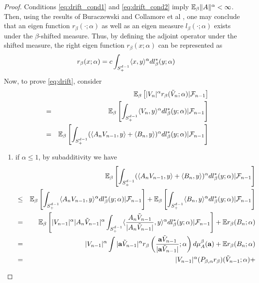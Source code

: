 \documentclass{article}
\theoremstyle{remark}
\begin{document}
\begin{proof}
  Conditions \eqref{eq:drift_cond1} and \eqref{eq:drift_cond2} imply $\mathbb{E}_\beta
  \|A\|^\alpha < \infty$. Then, using the results of Buraczewski and
  Collamore et al \cite{BCDZ2014}, one may conclude that an eigen
  function $r_\beta(\cdot; \alpha)$ as well as an eigen measure
  $l_\beta(\cdot; \alpha)$ exists under the $\beta$-shifted
  measure. Thus, by defining the adjoint operator under  the shifted
  measure, the right eigen function $r_\beta(x; \alpha)$ can be represented as
  \[
  r_\beta(x; \alpha) = c \int_{S_+^{d-1}} \langle x, y\rangle^\alpha
  dl^*_{\beta}(y; \alpha)
  \]
Now, to prove \eqref{eq:drift}, consider
  \begin{eqnarray}
    && \mathbb{E}_\beta \left[ |V_n|^\alpha r_\beta(\tilde V_n; \alpha) | \mathcal F_{n-1} \right]
    \nonumber \\
    &=& \mathbb{E}_\beta\left[\int_{S_+^{d-1}} \langle V_n, y\rangle^\alpha dl^*_{\beta}(y; \alpha)|
      \mathcal F_{n-1} \right]
    \nonumber \\
    &=& \mathbb{E}_\beta\left[\int_{S_+^{d-1}} (\langle A_n V_{n-1}, y\rangle + \langle B_n,
        y\rangle)^\alpha dl^*_{\beta}(y; \alpha) | \mathcal F_{n-1} \right]
    \label{eq:drift_proof_1}
  \end{eqnarray}
  \begin{enumerate}
  \item if $\alpha \leq 1$, by subadditivity we have
    \begin{eqnarray*}
      &&\E_\beta\left[\int_{S_+^{d-1}} (\inn{A_n V_{n-1}, y} + \inn{B_n,
          y})^\alpha dl^*_{\beta}(y; \alpha) | \mathcal F_{n-1} \right]\\
      &\leq& \E_\beta\left[\int_{S_+^{d-1}} \inn{A_n V_{n-1}, y}^\alpha
        dl^*_{\beta}(y; \alpha) | \mathcal F_{n-1} \right]
      + \E_\beta\left[\int_{S_+^{d-1}} \inn{B_n, y}^\alpha dl^*_{\beta}(y; \alpha) |
        \mathcal F_{n-1} \right] \\
      &=& \E_\beta\left[|V_{n-1}|^\alpha |A_n \tilde V_{n-1}|^\alpha\int_{S_+^{d-1}}
        \inn{ {A_n \tilde V_{n-1} \over |A_n \tilde V_{n-1}|}, y}^\alpha
        dl^*_{\beta}(y; \alpha) | \mathcal F_{n-1} \right]  + \E r_\beta(B_n; \alpha)\\
      &=& |V_{n-1}|^\alpha  \int |\mathbf a \tilde V_{n-1}|^\alpha
      r_\beta\left({\mathbf a \tilde V_{n-1} \over |\mathbf a \tilde V_{n-1}|}; \alpha\right)
      d\mu_A^\beta (\mathbf a) + \E r_\beta(B_n; \alpha) \\
      &=& |V_{n-1}|^\alpha (P_{\beta, \alpha} r_{\beta})(\tilde V_{n-1}; \alpha) +

\end{eqnarray*}
\end{enumerate}
\end{proof}
\end{document}
